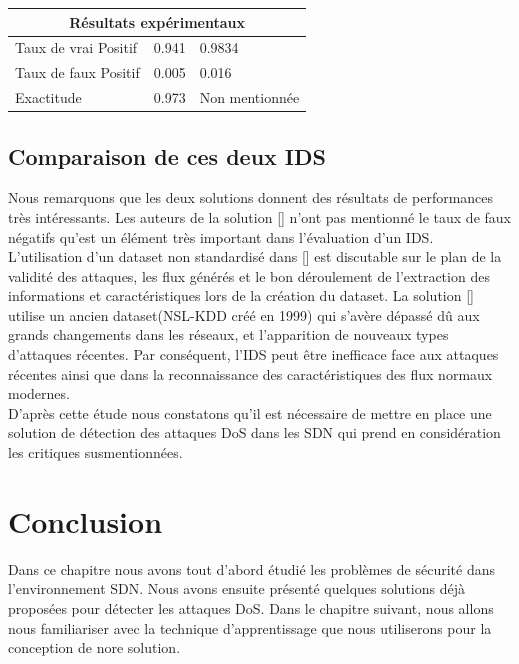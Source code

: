 \begin{tabular}{| m{4cm} | m{5cm} | m{5cm} |}
\multicolumn{3}{c}{Résultats expérimentaux}\\
\hline
Taux de vrai Positif & 0.941 & 0.9834\\
\hline
Taux de faux Positif & 0.005 & 0.016\\
\hline
Exactitude & 0.973 & Non mentionnée \\
\hline
\end{tabular}

\subsection{Comparaison de ces deux IDS}
Nous remarquons que les deux solutions donnent des résultats de performances très intéressants. Les auteurs de la solution [\cite{11}] n’ont pas mentionné le taux de faux négatifs qu’est un élément très important dans l’évaluation d’un IDS. L’utilisation d’un dataset non standardisé dans [\cite{11}] est discutable sur le plan de la validité des attaques, les flux générés et le bon déroulement de l’extraction des informations et caractéristiques lors de la création du dataset. La solution [\cite{13}] utilise un ancien dataset(NSL-KDD créé en 1999) qui s’avère dépassé dû aux grands changements dans les réseaux, et l’apparition de nouveaux types d’attaques récentes. Par conséquent, l’IDS peut être inefficace face aux attaques récentes ainsi que dans la reconnaissance des caractéristiques des flux normaux modernes.\\
D’après cette étude nous constatons qu’il est nécessaire de mettre en place une solution de détection des attaques DoS dans les SDN qui prend en considération les critiques susmentionnées. 

\section{Conclusion}
Dans ce chapitre nous avons tout d’abord étudié les problèmes de sécurité dans l’environnement SDN. Nous avons ensuite présenté quelques solutions déjà proposées pour détecter les attaques DoS. Dans le chapitre suivant, nous allons nous familiariser avec la technique d’apprentissage que nous utiliserons pour la conception de nore solution. 

